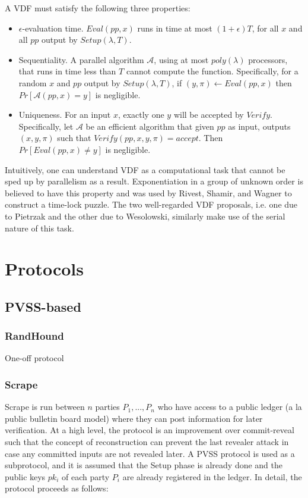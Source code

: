 \documentclass[11pt]{article}
\theoremstyle{definition}
\theoremstyle{remark}
\begin{document}
A VDF must satisfy the following three properties:
\begin{itemize}
\item $\epsilon$-evaluation time. $Eval(pp, x)$ runs in time at most $(1 + \epsilon) T$, for all $x$ and all $pp$ output by $Setup(\lambda, T)$.
\item Sequentiality. A parallel algorithm $\mathcal{A}$, using at most $poly(\lambda)$ processors, that runs in time less than $T$ cannot compute the function. Specifically, for a random $x$ and $pp$ output by $Setup(\lambda, T)$, if $(y, \pi) \leftarrow Eval(pp, x)$ then $Pr[\mathcal{A}(pp, x) = y]$ is negligible.
\item Uniqueness. For an input $x$, exactly one $y$ will be accepted by $Verify$. Specifically, let $\mathcal{A}$ be an efficient algorithm that given $pp$ as input, outputs $(x, y, \pi)$ such that $Verify(pp, x, y, \pi) = accept$. Then $Pr[Eval(pp, x) \neq y]$ is negligible.
\end{itemize}

Intuitively, one can understand VDF as a computational task that cannot be sped up by parallelism as a result. Exponentiation in a group of unknown order is believed to have this property and was used by Rivest, Shamir, and Wagner to construct a time-lock puzzle. The two well-regarded VDF proposals, i.e. one due to Pietrzak and the other due to Wesolowski, similarly make use of the serial nature of this task.

\section{Protocols}
\subsection{PVSS-based}

\subsubsection{RandHound}
One-off protocol

\subsubsection{Scrape}
Scrape is run between $n$ parties $P_1, ..., P_n$ who have access to a public ledger (a la public bulletin board model) where they can post information for later verification. At a high level, the protocol is an improvement over commit-reveal such that the concept of reconstruction can prevent the last revealer attack in case any committed inputs are not revealed later. A PVSS protocol is used as a subprotocol, and it is assumed that the Setup phase is already done and the public keys $pk_i$ of each party $P_i$ are already registered in the ledger. In detail, the protocol proceeds as follows:
\end{document}
